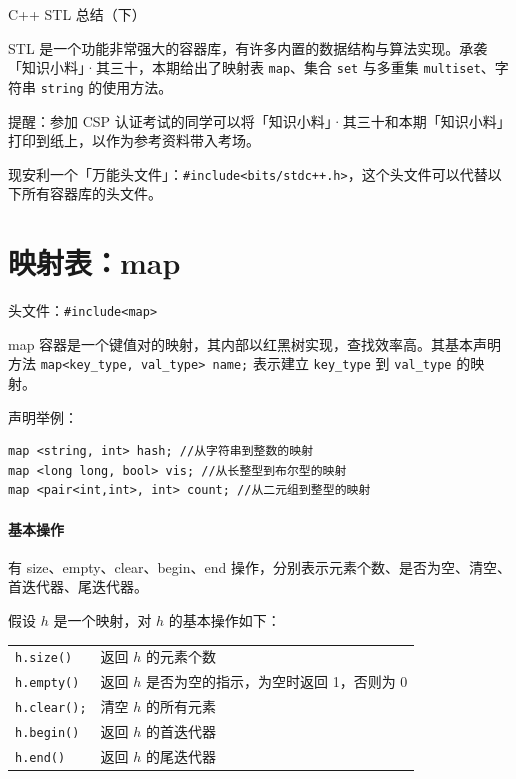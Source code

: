 \documentclass[UTF8]{ctexart}
\newcommand\Emph[1]{\colorbox{green!10}{\textcolor{green!30!black}{#1}}}
\begin{document}
{\color{cyan!50!black}
\begin{center}
    C++ STL 总结（下）
\end{center}

STL 是一个功能非常强大的容器库，有许多内置的数据结构与算法实现。承袭「知识小料」·其三十，本期给出了映射表 \verb!map!、集合 \verb!set! 与多重集 \verb!multiset!、字符串 \verb!string! 的使用方法。
}

提醒：参加 CSP 认证考试的同学可以将「知识小料」·其三十和本期「知识小料」打印到纸上，以作为参考资料带入考场。

现安利一个「万能头文件」：\cprotect\Emph{\verb!#include<bits/stdc++.h>!}，这个头文件可以代替以下所有容器库的头文件。

\section{映射表：map}
头文件：\verb!#include<map>!

map 容器是一个键值对的映射，其内部以红黑树实现，查找效率高。其基本声明方法 \verb!map<key_type, val_type> name;! 表示建立 \verb!key_type! 到 \verb!val_type! 的映射。

声明举例：
\begin{lstlisting}[numbers=none]
map <string, int> hash; //从字符串到整数的映射
map <long long, bool> vis; //从长整型到布尔型的映射
map <pair<int,int>, int> count; //从二元组到整型的映射
\end{lstlisting}

\paragraph{基本操作} 有 size、empty、clear、begin、end 操作，分别表示元素个数、是否为空、清空、首迭代器、尾迭代器。

假设 $h$ 是一个映射，对 $h$ 的基本操作如下：
\begin{table}[H]
    \centering
    \begin{tabular}{ll}
        \verb!h.size()! & 返回 $h$ 的元素个数  \\
        \verb!h.empty()! & 返回 $h$ 是否为空的指示，为空时返回 1，否则为 0 \\
        \verb!h.clear();! & 清空 $h$ 的所有元素 \\
        \verb!h.begin()! & 返回 $h$ 的首迭代器  \\
        \verb!h.end()! & 返回 $h$ 的尾迭代器  \\
    \end{tabular}
\end{table}
\end{document}
